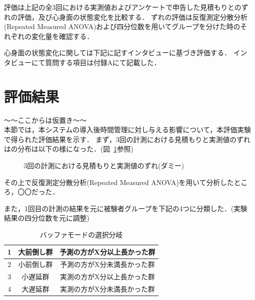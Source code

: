 評価は上記の全3回における実測値およびアンケートで申告した見積もりとのずれの評価，及び心身面の状態変化を比較する．
ずれの評価は反復測定分散分析(Repeated Measured ANOVA)および四分位数を用いてグループを分けた時のそれぞれの変化量を確認する．

心身面の状態変化に関しては下記に記すインタビューに基づき評価する．
インタビューにて質問する項目は付録Aにて記載した．%

\section{評価結果}
〜〜ここからは仮置き〜〜\\
本節では，本システムの導入後時間管理に対し与える影響について，本評価実験で得られた評価結果を示す．
まず，3回の計測における見積もりと実測値のずれはの分布は以下の様になった．(図~\ref{fig:hakohige}参照)

\begin{figure}[hb]
	\begin{center}
	\caption{3回の計測における見積もりと実測値のずれ(ダミー)}
	\label{fig:hakohige}
	\end{center}
\end{figure}

その上で反復測定分散分析(Repeated Measured ANOVA)を用いて分析したところ，〇〇だった．

また，1回目の計測の結果を元に被験者グループを下記の4つに分類した．(実験結果の四分位数を元に調整)

\begin{table}[htb]
  \begin{center}
  \begin{tabular}{|c|c|c|} \hline
    1 & 大前倒し群 & 予測の方がX分以上長かった群  \\ \hline
    2 & 小前倒し群 & 予測の方がX分未満長かった群  \\ \hline
    3 & 小遅延群 & 実測の方がX分以上長かった群  \\ \hline
    4 & 大遅延群 & 実測の方がX分未満長かった群  \\ \hline 
  \end{tabular}
    \caption{バッファモードの選択分岐}
    \label{tb:buffer}
  \end{center}
\end{table}

